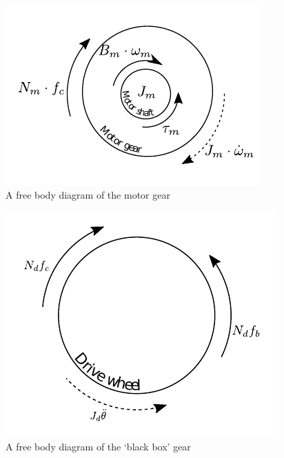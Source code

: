 
\begin{figure}[H]
	\centering
	\includegraphics[scale=0.8]{figures/freeBodyMotorGear.pdf}
	\caption{A free body diagram of the motor gear}
	\label{fig:MotorGearFreeBodyDiagram}
\end{figure}

\begin{figure}[H]
	\centering
	\includegraphics[scale=0.8]{figures/freeBodyDrive.pdf}
	\caption{A free body diagram of the `black box' gear}
	\label{fig:BlackBoxGearFreeBodyDiagram}
\end{figure}


